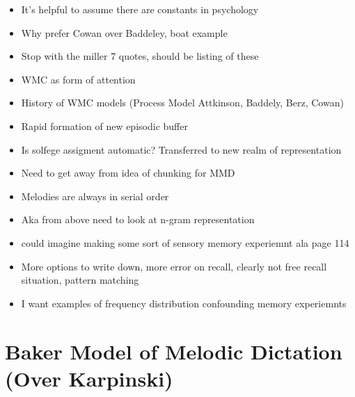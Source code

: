 \documentclass[]{book}
\theoremstyle{definition}
\theoremstyle{definition}
\theoremstyle{definition}
\theoremstyle{remark}
\begin{document}
\begin{itemize}
\item
  It's helpful to assume there are constants in psychology
\item
  Why prefer Cowan over Baddeley, boat example
\item
  Stop with the miller 7 quotes, should be listing of these
\item
  WMC as form of attention
\item
  History of WMC models (Process Model Attkinson, Baddely, Berz, Cowan)
\item
  Rapid formation of new episodic buffer
\item
  Is solfege assigment automatic? Transferred to new realm of
  representation
\item
  Need to get away from idea of chunking for MMD
\item
  Melodies are always in serial order
\item
  Aka from above need to look at n-gram representation
\item
  could imagine making some sort of sensory memory experiemnt ala page
  114
\item
  More options to write down, more error on recall, clearly not free
  recall situation, pattern matching
\item
  I want examples of frequency distribution confounding memory
  experiemnts
\end{itemize}

\hypertarget{baker-model-of-melodic-dictation-over-karpinski}{%
\section{Baker Model of Melodic Dictation (Over
Karpinski)}\label{baker-model-of-melodic-dictation-over-karpinski}}
\end{document}
